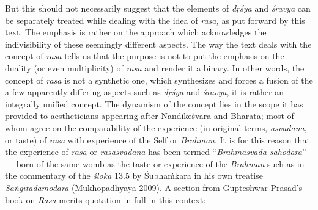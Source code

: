 But this should not necessarily suggest that the elements of \textsl{dṛśya} and \textsl{śravya} can be separately treated while dealing with the idea of \textsl{rasa,} as put forward by this text. The emphasis is rather on the approach which acknowledges the indivisibility of these seemingly different aspects. The way the text deals with the concept of \textsl{rasa} tells us that the purpose is not to put the emphasis on the duality (or even multiplicity) of \textsl{rasa} and render it a binary. In other words, the concept of \textsl{rasa} is not a synthetic one, which synthesizes and forces a fusion of the a few apparently differing aspects such as \textsl{dṛśya} and \textsl{śravya}, it is rather an integrally unified concept. The dynamism of the concept lies in the scope it has provided to aestheticians appearing after Nandikeśvara and Bharata; most of whom agree on the comparability of the experience (in original terms, \textsl{āsvādana}, or taste) of \textsl{rasa} with experience of the Self or \textsl{Brahman}. It is for this reason that the experience of \textsl{rasa} or \textsl{rasāsvādana} has been termed “\textsl{Brahmāsvāda-sahodara}” --- born of the same womb as the taste or experience of the \textsl{Brahman} such as in the commentary of the \textsl{śloka} 13.5 by Śubhaṁkara in his own treatise \textsl{Saṅgītadāmodara} (Mukhopadhyaya 2009). A section from Gupteshwar Prasad’s book on \textsl{Rasa} merits quotation in full in this context: 

